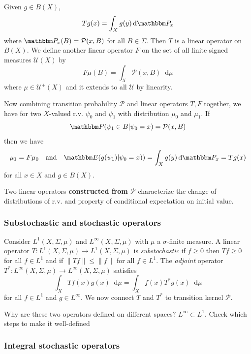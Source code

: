 \documentclass[12pt, reqno]{amsart}
\renewcommand{\leq}{\leqslant}
\renewcommand{\geq}{\geqslant}
\newcommand{\1}{\mathbbm 1}
\newcommand*\diff{\mathop{}\!\mathrm{d}}
\newcommand{\pP}{\mathcal P}
\newcommand{\PP}{\mathbbm P}
\newcommand{\EE}{\mathbbm E}
\theoremstyle{plain}
\theoremstyle{definition}
\begin{document}
Given $g\in B(X)$, 
\begin{equation*}
	T g(x)=\int_{X}g(y) \diff\PP_x
\end{equation*}
where $\PP_x(B)=\pP(x,B)$ for all $B\in\Sigma.$ Then $T$ is a linear operator on $B(X).$ We define another linear operator $F$ on the set of all finite signed measures $\mathcal{U}(X)$ by 
\begin{equation*}
	F\mu(B)=\int_{X}\pP(x,B) \diff\mu
\end{equation*}
where $\mu\in\mathcal{U}^+(X)$ and it extends to all $ \mathcal{U}$ by linearity.

Now combining transition probability $\pP$ and linear operators $T,F$ together, we have for two $X$-valued r.v. $\psi_0$ and $\psi_1$ with distribution  $\mu_0$ and $\mu_1$. If $$\PP(\psi_1\in B|\psi_0=x)=\pP(x,B)$$ then we have
\begin{equation*}
	\mu_1=F\mu_0~~~\text{and}~~~\EE(g(\psi_1)|\psi_0=x))=\int_{X}g(y)\diff \PP_x=Tg(x)
\end{equation*}
for all $x\in X$ and $g\in B(X).$

\noindent\color{violet} Two linear operators \textbf{constructed from $\pP$} characterize the change of distributions of r.v. and property of conditional expectation on initial value.\color{black}


\subsubsection{Substochastic and stochastic operators}
Consider $L^1(X,\Sigma,\mu)$ and $L^{\infty}(X,\Sigma,\mu)$ with $\mu$ a $\sigma$-finite measure.  A linear operator $T\colon L^1(X,\Sigma,\mu)\rightarrow L^1(X,\Sigma,\mu)$ is \emph{substochastic} if $f\geq 0$ then $Tf\geq0$ for all $f\in L^1$ and if $\|Tf\|\leq \|f\|$ for all $f\in L^1$. The \emph{adjoint} operator $T^*\colon L^{\infty}(X,\Sigma,\mu)\rightarrow L^{\infty}(X,\Sigma,\mu)$ satisfies
\begin{equation*}
	\int_{X}Tf(x)g(x)\diff \mu=\int_{X}f(x)T^*g(x)\diff \mu
\end{equation*}
for all $f\in L^1$ and $g\in L^{\infty}.$ We now  connect $T$ and $T^*$ to transition kernel $\pP.$

\noindent\color{blue} Why are these two operators defined on different spaces? $L^{\infty}\subset L^1.$ Check which steps to make it well-defined \color{black}

\subsubsection{Integral stochastic operators}
\end{document}

